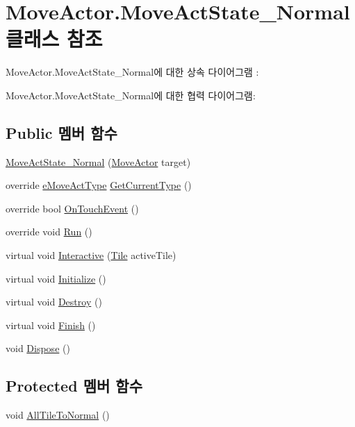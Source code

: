 \hypertarget{class_move_actor_1_1_move_act_state___normal}{}\section{Move\+Actor.\+Move\+Act\+State\+\_\+\+Normal 클래스 참조}
\label{class_move_actor_1_1_move_act_state___normal}


Move\+Actor.\+Move\+Act\+State\+\_\+\+Normal에 대한 상속 다이어그램 \+: 


Move\+Actor.\+Move\+Act\+State\+\_\+\+Normal에 대한 협력 다이어그램\+:
\subsection*{Public 멤버 함수}
\begin{DoxyCompactItemize}
\item 
\hyperlink{class_move_actor_1_1_move_act_state___normal_a43d9a631de0e6f95d31f7b1894c7cbd7}{Move\+Act\+State\+\_\+\+Normal} (\hyperlink{class_move_actor}{Move\+Actor} target)
\item 
override \hyperlink{_move_actor_8cs_a1df5a2532cc7e6bde40a57d2dcbe23fe}{e\+Move\+Act\+Type} \hyperlink{class_move_actor_1_1_move_act_state___normal_a468c609527da80cb60e43c4ae99feb6d}{Get\+Current\+Type} ()
\item 
override bool \hyperlink{class_move_actor_1_1_move_act_state___normal_a56d413f30e45ab6b2d3a22b972588e95}{On\+Touch\+Event} ()
\item 
override void \hyperlink{class_move_actor_1_1_move_act_state___normal_ac679d09107c9471774c30ffc169b5ad0}{Run} ()
\item 
virtual void \hyperlink{class_move_actor_1_1_move_act_state_ae43bc38159d36bd83eaf172d946c0415}{Interactive} (\hyperlink{class_tile}{Tile} active\+Tile)
\item 
virtual void \hyperlink{class_m_c_n_1_1_state_a8eabaffe047e6dccd5c5d8aed7bf218a}{Initialize} ()
\item 
virtual void \hyperlink{class_m_c_n_1_1_state_a32af22a6a0a979d3b3a80225426aa839}{Destroy} ()
\item 
virtual void \hyperlink{class_m_c_n_1_1_state_a6de4f94b23916fcd05f589759da9ac3f}{Finish} ()
\item 
void \hyperlink{class_m_c_n_1_1_state_a6c53b2eda47e718ff469fd76a95cf02a}{Dispose} ()
\end{DoxyCompactItemize}
\subsection*{Protected 멤버 함수}
\begin{DoxyCompactItemize}
\item 
void \hyperlink{class_move_actor_1_1_move_act_state_a8e1d5e7942d4f9de8c8e0732964c554b}{All\+Tile\+To\+Normal} ()
\end{DoxyCompactItemize}
